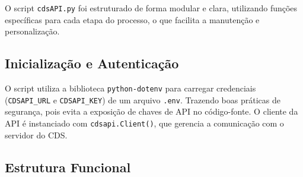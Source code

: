 \documentclass[12pt, a4paper]{article}
\begin{document}
O script \texttt{cdsAPI.py} foi estruturado de forma modular e clara, utilizando funções específicas para cada etapa do processo, o que facilita a manutenção e personalização.

\subsection{Inicialização e Autenticação}
O script utiliza a biblioteca \texttt{python-dotenv} para carregar credenciais (\texttt{CDSAPI\_URL} e \texttt{CDSAPI\_KEY}) de um arquivo \texttt{.env}. Trazendo boas práticas de segurança, pois evita a exposição de chaves de API no código-fonte. O cliente da API é instanciado com \texttt{cdsapi.Client()}, que gerencia a comunicação com o servidor do CDS.

\subsection{Estrutura Funcional}
\end{document}
